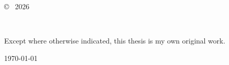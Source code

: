 \vspace*{14cm}
\begin{center}
  \makeatletter
  \copyright\ \@author{} 2026
  \makeatother
\end{center}
\noindent
\begin{center}
  \footnotesize{~} %
\end{center}
\noindent

\newpage

\vspace*{7cm}
\begin{center}
  Except where otherwise indicated, this thesis is my own original
  work.
\end{center}

\vspace*{4cm}

\hspace{8cm}\makeatletter\@author\makeatother\par
\hspace{8cm}\today
